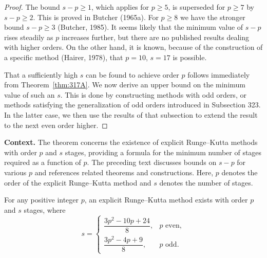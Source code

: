 \begin{proof}
The bound $s - p \geq 1$, which applies for $p \geq 5$, is superseded for $p \geq 7$ by $s - p \geq 2$. This is proved in Butcher (1965a). For $p \geq 8$ we have the stronger bound $s - p \geq 3$ (Butcher, 1985). It seems likely that the minimum value of $s - p$ rises steadily as $p$ increases further, but there are no published results dealing with higher orders. On the other hand, it is known, because of the construction of a specific method (Hairer, 1978), that $p = 10$, $s = 17$ is possible.

That a sufficiently high $s$ can be found to achieve order $p$ follows immediately from Theorem~\ref{thm:317A}. We now derive an upper bound on the minimum value of such an $s$. This is done by constructing methods with odd orders, or methods satisfying the generalization of odd orders introduced in Subsection 323. In the latter case, we then use the results of that subsection to extend the result to the next even order higher.
\end{proof}

\noindent\textbf{Context.}
The theorem concerns the existence of explicit Runge--Kutta methods with order $p$ and $s$ stages, providing a formula for the minimum number of stages required as a function of $p$. The preceding text discusses bounds on $s-p$ for various $p$ and references related theorems and constructions. Here, $p$ denotes the order of the explicit Runge--Kutta method and $s$ denotes the number of stages.

\begin{theorem}

  \label{thm:324C}
For any positive integer $p$, an explicit Runge--Kutta method exists with order $p$ and $s$ stages, where
\[
s = \begin{cases}
\dfrac{3p^2 - 10p + 24}{8}, & p \text{ even}, \\[8pt]
\dfrac{3p^2 - 4p + 9}{8},   & p \text{ odd}.
\end{cases}
\]
\end{theorem}

